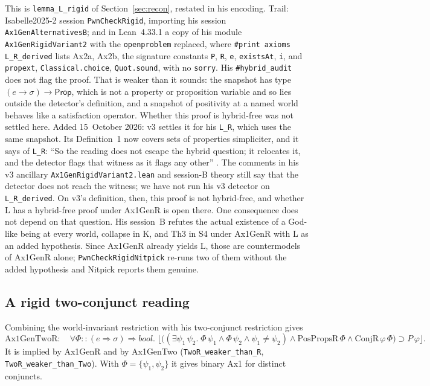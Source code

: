 \documentclass[11pt,a4paper]{article}
\newcommand{\valid}[1]{\lfloor #1 \rfloor}
\newcommand{\lean}[1]{\texttt{#1}}
\theoremstyle{definition}
\theoremstyle{remark}
\begin{document}
This is \lean{lemma\_L\_rigid} of Section~\ref{sec:recon}, restated in his
encoding.
Trail: Isabelle2025-2 session \lean{PwnCheckRigid}, importing his session
\lean{Ax1GenAlternativesB}; and in Lean~4.33.1 a copy of his module
\lean{Ax1GenRigidVariant2} with the \lean{openproblem} replaced, where
\lean{\#print axioms L\_R\_derived} lists Ax2a, Ax2b, the signature
constants \lean{P}, \lean{R}, \lean{e}, \lean{existsAt}, \lean{i}, and
\lean{propext}, \lean{Classical.choice}, \lean{Quot.sound}, with no
\lean{sorry}.
His \lean{\#hybrid\_audit} does not flag the proof.
That is weaker than it sounds: the snapshot has type
\((e \to \sigma) \to \mathsf{Prop}\), which is not a property or proposition
variable and so lies outside the detector's definition, and a snapshot of
positivity at a named world behaves like a satisfaction operator.
Whether this proof is hybrid-free was not settled here.
Added 15~October 2026: v3 settles it for his \lean{L\_R}, which uses the
same snapshot.
Its Definition~1 now covers sets of properties simpliciter, and it says of
\lean{L\_R}: ``So the reading does not escape the hybrid question; it
relocates it, and the detector flags that witness as it flags any other''
\cite[v3, Sect.~6.4.3]{benzmuellerPWN2026}.
The comments in his v3 ancillary \lean{Ax1GenRigidVariant2.lean} and
session-B theory still say that the detector does not reach the witness; we
have not run his v3 detector on \lean{L\_R\_derived}.
On v3's definition, then, this proof is not hybrid-free, and whether L has a
hybrid-free proof under Ax1GenR is open there.
One consequence does not depend on that question.
His session~B refutes the actual existence of a God-like being at every
world, collapse in K, and Th3 in S4 under Ax1GenR with L as an added
hypothesis.
Since Ax1GenR already yields L, those are countermodels of Ax1GenR alone;
\lean{PwnCheckRigidNitpick} re-runs two of them without the added hypothesis
and Nitpick reports them genuine.

\subsection{A rigid two-conjunct reading}

Combining the world-invariant restriction with his two-conjunct restriction
gives
\[
  \mathrm{Ax1GenTwoR}:\quad
  \forall \Phi{::}(e \Rightarrow \sigma) \Rightarrow \mathit{bool}.\;
  \valid{\bigl((\exists \psi_1\,\psi_2.\; \Phi\,\psi_1 \land \Phi\,\psi_2
     \land \psi_1 \neq \psi_2) \land \mathrm{PosPropsR}\,\Phi \land
     \mathrm{ConjR}\,\varphi\,\Phi\bigr) \supset P\,\varphi}.
\]
It is implied by Ax1GenR and by Ax1GenTwo (\lean{TwoR\_weaker\_than\_R},
\lean{TwoR\_weaker\_than\_Two}).
With \(\Phi = \{\psi_1, \psi_2\}\) it gives binary Ax1 for distinct
conjuncts.
\end{document}
